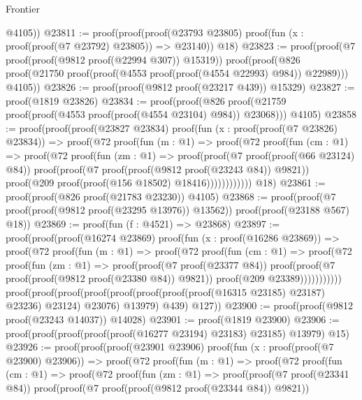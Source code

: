 \begin{lexlean}{Frontier}
\begin{coremodule}
          @4105))
@23811 := proof(proof(proof(@23793 @23805)
        proof(fun (x : proof(proof(@7 @23792) @23805)) => @23140))
      @18)
@23823 := proof(proof(@7 proof(proof(@9812 proof(@22994 @307)) @15319))
      proof(proof(@826 proof(@21750 proof(proof(@4553 proof(proof(@4554 @22993) @984)) @22989)))
          @4105))
@23826 := proof(proof(@9812 proof(@23217 @439)) @15329)
@23827 := proof(@1819 @23826)
@23834 := proof(proof(@826 proof(@21759 proof(proof(@4553 proof(proof(@4554 @23104) @984)) @23068)))
      @4105)
@23858 := proof(proof(proof(@23827 @23834)
        proof(fun (x : proof(proof(@7 @23826) @23834)) =>
          proof(@72
              proof(fun (m : @1) =>
                proof(@72
                    proof(fun (cm : @1) =>
                      proof(@72
                          proof(fun (zm : @1) =>
                            proof(proof(@7 proof(proof(@66 @23124) @84))
                                proof(proof(@7 proof(proof(@9812 proof(@23243 @84)) @9821))
                                    proof(@209 proof(proof(@156 @18502) @18416))))))))))))
      @18)
@23861 := proof(proof(@826 proof(@21783 @23230)) @4105)
@23868 := proof(proof(@7 proof(proof(@9812 proof(@23295 @13976)) @13562))
      proof(proof(@23188 @567) @18))
@23869 := proof(fun (f : @4521) => @23868)
@23897 := proof(proof(proof(@16274 @23869)
        proof(fun (x : proof(@16286 @23869)) =>
          proof(@72
              proof(fun (m : @1) =>
                proof(@72
                    proof(fun (cm : @1) =>
                      proof(@72
                          proof(fun (zm : @1) =>
                            proof(proof(@7 proof(@23377 @84))
                                proof(proof(@7 proof(proof(@9812 proof(@23380 @84)) @9821))
                                    proof(@209 @23389)))))))))))
      proof(proof(proof(proof(proof(proof(proof(proof(@16315 @23185) @23187) @23236) @23124) @23076)
              @13979)
            @439)
          @127))
@23900 := proof(proof(@9812 proof(@23243 @14037)) @14028)
@23901 := proof(@1819 @23900)
@23906 := proof(proof(proof(proof(proof(@16277 @23194) @23183) @23185) @13979) @15)
@23926 := proof(proof(proof(@23901 @23906)
        proof(fun (x : proof(proof(@7 @23900) @23906)) =>
          proof(@72
              proof(fun (m : @1) =>
                proof(@72
                    proof(fun (cm : @1) =>
                      proof(@72
                          proof(fun (zm : @1) =>
                            proof(proof(@7 proof(@23341 @84))
                                proof(proof(@7 proof(proof(@9812 proof(@23344 @84)) @9821))

\end{coremodule}
\end{lexlean}
